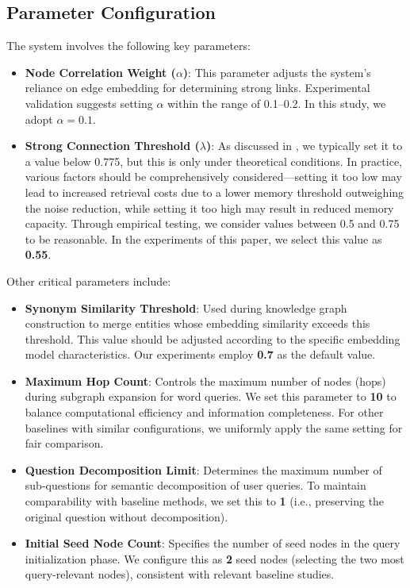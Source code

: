 \subsection{Parameter Configuration}
\label{appendix:parameter-configuration}

The system involves the following key parameters:

\begin{itemize}[leftmargin = 15pt]
    \item \textbf{Node Correlation Weight ($\alpha$)}: 
    This parameter adjusts the system's reliance on edge embedding for determining strong links. Experimental validation suggests setting $\alpha$ within the range of 0.1--0.2. In this study, we adopt $\alpha = \bm{0.1}$.

    \item \textbf{Strong Connection Threshold ($\lambda$)}: 
    As discussed in , we typically set it to a value below 0.775, but this is only under theoretical conditions. In practice, various factors should be comprehensively considered—setting it too low may lead to increased retrieval costs due to a lower memory threshold outweighing the noise reduction, while setting it too high may result in reduced memory capacity. Through empirical testing, we consider values between 0.5 and 0.75 to be reasonable. In the experiments of this paper, we select this value as \textbf{0.55}.
\end{itemize}

Other critical parameters include:

\begin{itemize}[leftmargin = 15pt]
    \item \textbf{Synonym Similarity Threshold}: 
    Used during knowledge graph construction to merge entities whose embedding similarity exceeds this threshold. This value should be adjusted according to the specific embedding model characteristics. Our experiments employ \textbf{0.7} as the default value.

    \item \textbf{Maximum Hop Count}: 
    Controls the maximum number of nodes (hops) during subgraph expansion for word queries. We set this parameter to \textbf{10} to balance computational efficiency and information completeness. For other baselines with similar configurations, we uniformly apply the same setting for fair comparison.

    \item \textbf{Question Decomposition Limit}: 
    Determines the maximum number of sub-questions for semantic decomposition of user queries. To maintain comparability with baseline methods, we set this to \textbf{1} (i.e., preserving the original question without decomposition).

    \item \textbf{Initial Seed Node Count}: 
    Specifies the number of seed nodes in the query initialization phase. We configure this as \textbf{2} seed nodes (selecting the two most query-relevant nodes), consistent with relevant baseline studies.
\end{itemize}

